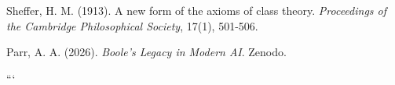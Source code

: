 





Sheffer, H. M. (1913). A new form of the axioms of class theory. \emph{Proceedings of the Cambridge Philosophical Society}, 17(1), 501-506.



















Parr, A. A. (2026). \emph{Boole's Legacy in Modern AI}. Zenodo.













```